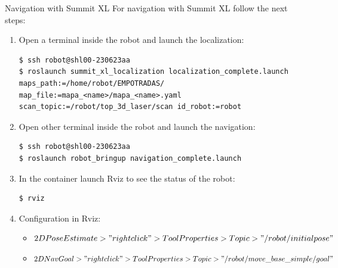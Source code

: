 



\begin{frame}[fragile]{Navigation with Summit XL}
For navigation with Summit XL follow the next steps: 
\begin{enumerate}
    \item Open a terminal inside the robot and launch the localization:
\begin{lstlisting}[language=shell]
$ ssh robot@shl00-230623aa
$ roslaunch summit_xl_localization localization_complete.launch maps_path:=/home/robot/EMPOTRADAS/ map_file:=mapa_<name>/mapa_<name>.yaml scan_topic:=/robot/top_3d_laser/scan id_robot:=robot
\end{lstlisting}

    \item Open other terminal inside the robot and launch the navigation:
\begin{lstlisting}[language=shell]
$ ssh robot@shl00-230623aa
$ roslaunch robot_bringup navigation_complete.launch 
\end{lstlisting}
    
    \item In the container launch Rviz to see the status of the robot:
\begin{lstlisting}[language=shell]
$ rviz
\end{lstlisting}

\item Configuration in Rviz:
\begin{itemize}
    \item $2D Pose Estimate > "right click" > Tool Properties > Topic > "/robot/initialpose"$
    \item $2D Nav Goal > "right click" > Tool Properties > Topic > "/robot/move\_base\_simple/goal"$
\end{itemize}
\end{enumerate}
\end{frame}


